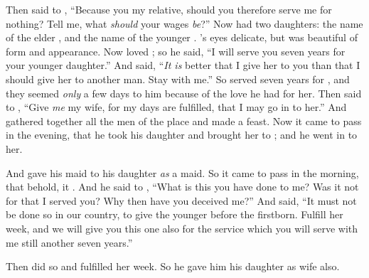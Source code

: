 \bverse Then \Laban said to \Jacob, ``Because you \are my relative, should you therefore serve me for nothing? Tell me, what \textit{should} your wages \textit{be}?''
\bverse Now \Laban had two daughters: the name of the elder \was \Leah, and the name of the younger \was \Rachel.
\bverse \Leah's eyes \were delicate, but \Rachel was beautiful of form and appearance.
\bverse Now \Jacob loved \Rachel; so he said, ``I will serve you seven years for \Rachel your younger daughter.''
\bverse And \Laban said, ``\textit{It is} better that I give her to you than that I should give her to another man. Stay with me.''
\bverse So \Jacob served seven years for \Rachel, and they seemed \textit{only} a few days to him because of the love he had for her.
\bverse Then \Jacob said to \Laban, ``Give \textit{me} my wife, for my days are fulfilled, that I may go in to her.''
\bverse And \Laban gathered together all the men of the place and made a feast.
\bverse Now it came to pass in the evening, that he took \Leah his daughter and brought her to \Jacob; and he went in to her.

\bverse And \Laban gave his maid  to his daughter \Leah \textit{as} a maid.
\bverse So it came to pass in the morning, that behold, it \was \Leah. And he said to \Laban, ``What is this you have done to me? Was it not for \Rachel that I served you? Why then have you deceived me?''
\bverse And \Laban said, ``It must not be done so in our country, to give the younger before the firstborn.
\bverse Fulfill her week, and we will give you this one also for the service which you will serve with me still another seven years.''

\bverse Then \Jacob did so and fulfilled her week. So he gave him his daughter \Rachel as wife also.


